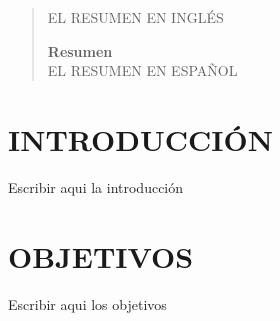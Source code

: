 \documentclass[12pt,a4paper,twoside]{article} %
\begin{document}
\makeatother
\thispagestyle{empty}
\newpage



\begin{abstract}
EL RESUMEN EN INGLÉS
\begin{center}
 \textbf{Resumen}\\
 \justify
EL RESUMEN EN ESPAÑOL
\end{center}
\hrulefill
\end{abstract}

\tableofcontents
\newpage
\listoftables
\newpage
\listoffigures
\newpage





\section{INTRODUCCIÓN}
Escribir aqui la introducción

\section{OBJETIVOS}
Escribir aqui los objetivos
\end{document}
